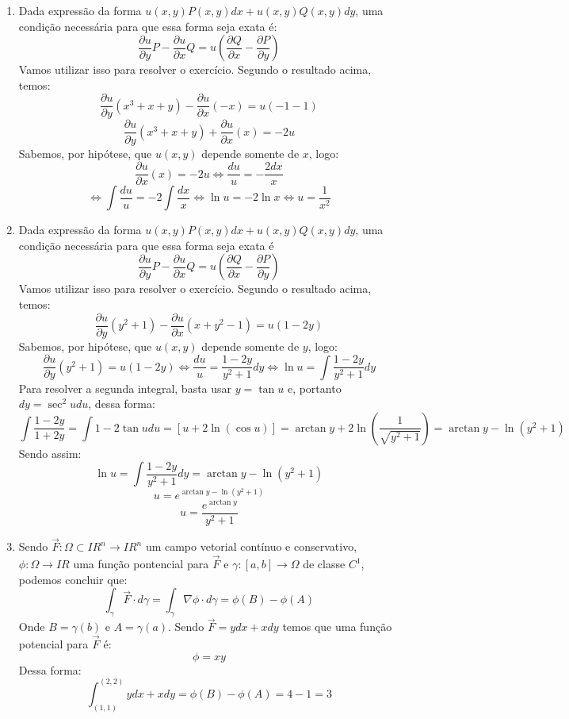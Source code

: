 \documentclass[11pt,a4paper]{article}
\begin{document}
\begin{enumerate}
\item Dada express\~{a}o da forma $ u(x,y)P(x,y)dx + u(x,y)Q(x,y)dy $, uma condi\c{c}\~{a}o necess\'{a}ria para que essa forma seja exata \'{e}: $$ \frac{\partial u}{\partial y}P - \frac{\partial u}{\partial x}Q = u \left(\frac{\partial Q}{\partial x} - \frac{\partial P}{\partial y} \right) $$ Vamos utilizar isso para resolver o exerc\'{i}cio. Segundo o resultado acima, temos: $$ \frac{\partial u}{\partial y} (x^3 + x + y) - \frac{\partial u}{\partial x} (-x) = u(-1-1) $$ $$ \frac{\partial u}{\partial y} (x^3 + x + y) + \frac{\partial u}{\partial x} (x) = -2u $$ Sabemos, por hip\'{o}tese, que $ u(x,y) $ depende somente de $ x $, logo: $$ \frac{\partial u}{\partial x} (x) = -2u \Leftrightarrow \frac{du}{u} = - \frac{2dx}{x} $$ $$ \Leftrightarrow \int \frac{du}{u} = -2 \int \frac{dx}{x} \Leftrightarrow \ln u = -2 \ln x \Leftrightarrow u = \frac{1}{x^2} $$

\item Dada express\~{a}o da forma $ u(x,y)P(x,y)dx + u(x,y)Q(x,y)dy $, uma condi\c{c}\~{a}o necess\'{a}ria para que essa forma seja exata \'{e} $$ \frac{\partial u}{\partial y}P - \frac{\partial u}{\partial x}Q = u \left(\frac{\partial Q}{\partial x} - \frac{\partial P}{\partial y} \right) $$ Vamos utilizar isso para resolver o exerc\'{i}cio. Segundo o resultado acima, temos: $$ \frac{\partial u}{\partial y} (y^2 + 1) - \frac{\partial u}{\partial x} (x + y^2 -1) = u(1-2y) $$ Sabemos, por hipótese, que $ u(x,y) $ depende somente de $ y $, logo: $$ \frac{\partial u}{\partial y} (y^2 + 1) = u(1-2y) \Leftrightarrow \frac{du}{u} = \frac{1-2y}{y^2 + 1}dy \Leftrightarrow \ln u = \int \frac{1-2y}{y^2 + 1}dy $$ Para resolver a segunda integral, basta usar $ y = \tan u $ e, portanto $ dy = \sec^2 udu $, dessa forma: $$ \int \frac{1-2y}{1+2y} = \int 1-2 \tan udu = [u+2 \ln (\cos u)] = \arctan y + 2 \ln \left(\frac{1}{\sqrt{y^2 + 1}} \right) = \arctan y - \ln (y^2 + 1) $$ Sendo assim: $$ \ln u = \int \frac{1-2y}{y^2 + 1}dy = \arctan y - \ln (y^2 + 1) $$ $$ u = e^{\arctan y - \ln (y^2 + 1)} $$ $$ u = \frac{e^{\arctan y}}{y^2 + 1} $$

\item Sendo $ \vec{F} : \Omega \subset I\!R^n \longrightarrow I\!R^n $ um campo vetorial cont\'{i}nuo e conservativo, $ \phi : \Omega \longrightarrow I\!R $ uma fun\c{c}\~{a}o pontencial para $ \vec{F} $ e $ \gamma : [a,b] \longrightarrow \Omega $ de classe $ C^1 $, podemos concluir que: $$ \int_\gamma \vec{F} \cdot d \gamma = \int_\gamma \nabla \phi \cdot d \gamma = \phi (B) - \phi (A) $$ Onde $ B = \gamma (b) $ e $ A = \gamma (a) $. Sendo $ \vec{F} = ydx + xdy $ temos que uma fun\c{c}\~{a}o potencial para $ \vec{F} $ \'{e}: $$ \phi = xy $$ Dessa forma: $$ \int_{(1,1)}^{(2,2)} ydx + xdy = \phi (B) - \phi (A) = 4 - 1 = 3 $$


\end{enumerate}
\end{document}
